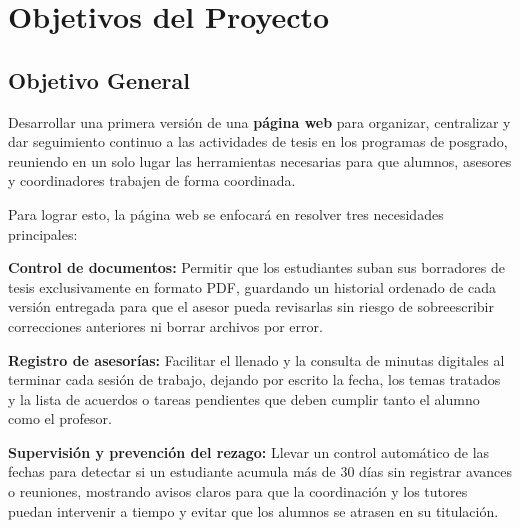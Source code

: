 \section{Objetivos del Proyecto}
\label{sec:objetivos}

\subsection{Objetivo General}
\label{subsec:obj_general}
    Desarrollar una primera versión de una \textbf{página web} para organizar, centralizar y dar seguimiento continuo a las actividades de tesis en los programas de posgrado, reuniendo en un solo lugar las herramientas necesarias para que alumnos, asesores y coordinadores trabajen de forma coordinada. 

    Para lograr esto, la página web se enfocará en resolver tres necesidades principales:

    \textbf{Control de documentos:} Permitir que los estudiantes suban sus borradores de tesis exclusivamente en formato PDF, guardando un historial ordenado de cada versión entregada para que el asesor pueda revisarlas sin riesgo de sobreescribir correcciones anteriores ni borrar archivos por error.

    \textbf{Registro de asesorías:} Facilitar el llenado y la consulta de minutas digitales al terminar cada sesión de trabajo, dejando por escrito la fecha, los temas tratados y la lista de acuerdos o tareas pendientes que deben cumplir tanto el alumno como el profesor.

    \textbf{Supervisión y prevención del rezago:} Llevar un control automático de las fechas para detectar si un estudiante acumula más de 30 días sin registrar avances o reuniones, mostrando avisos claros para que la coordinación y los tutores puedan intervenir a tiempo y evitar que los alumnos se atrasen en su titulación.
